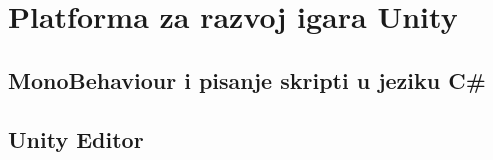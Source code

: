 \clearpage
\section{Platforma za razvoj igara Unity}

\subsection{MonoBehaviour i pisanje skripti u jeziku C\#}

\subsection{Unity Editor}





